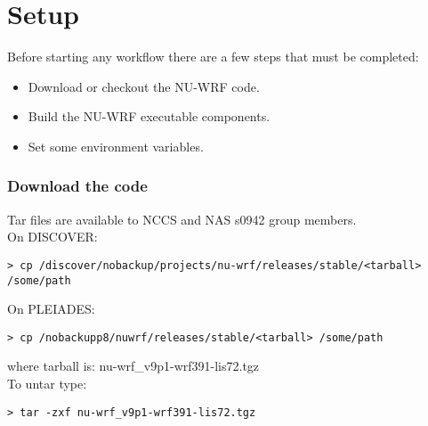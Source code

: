 \section{Setup}

\begin{frame}

Before starting any workflow there are a few steps that must be completed:
\begin{itemize}
     \item Download or checkout the NU-WRF code.
     \item Build the NU-WRF executable components.
     \item Set some environment variables.
\end{itemize}

\end{frame}

\begin{frame}[fragile]\frametitle{Download the code}

\footnotesize{
Tar files are available to NCCS and NAS s0942 group members. \\
On DISCOVER:
\begin{lstlisting}
> cp /discover/nobackup/projects/nu-wrf/releases/stable/<tarball> /some/path
\end{lstlisting}
On PLEIADES:
\begin{lstlisting}
> cp /nobackupp8/nuwrf/releases/stable/<tarball> /some/path
\end{lstlisting}
where tarball is:
nu-wrf\_v9p1-wrf391-lis72.tgz\\
\hfill \break
To untar type:
\begin{lstlisting}
> tar -zxf nu-wrf_v9p1-wrf391-lis72.tgz
\end{lstlisting}
}

\end{frame}

